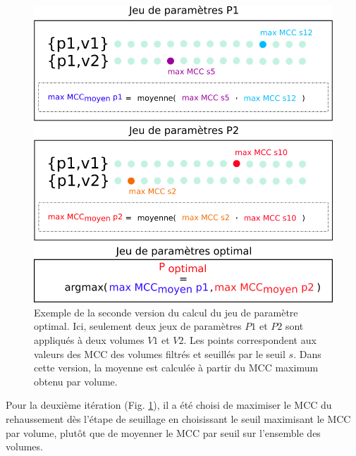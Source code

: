   \begin{figure}[!ht]
    \centering
    \includegraphics[width=\textwidth]{Images/optim_v2.png}
    \caption{Exemple de la seconde version du calcul du jeu de paramètre optimal. Ici, seulement deux jeux de paramètres $P1$ et $P2$ sont appliqués à deux volumes $V1$ et $V2$. Les points correspondent aux valeurs des MCC des volumes filtrés et seuillés par le seuil $s$. Dans cette version, la moyenne est calculée à partir du MCC maximum obtenu par volume.}
    \label{fig:optim_v2}
  \end{figure}

  Pour la deuxième itération (Fig. \ref{fig:optim_v2}), il a été choisi de maximiser le MCC du rehaussement dès l'étape de seuillage en choisissant le seuil maximisant le MCC par volume, plutôt que de moyenner le MCC par seuil sur l'ensemble des volumes. 

